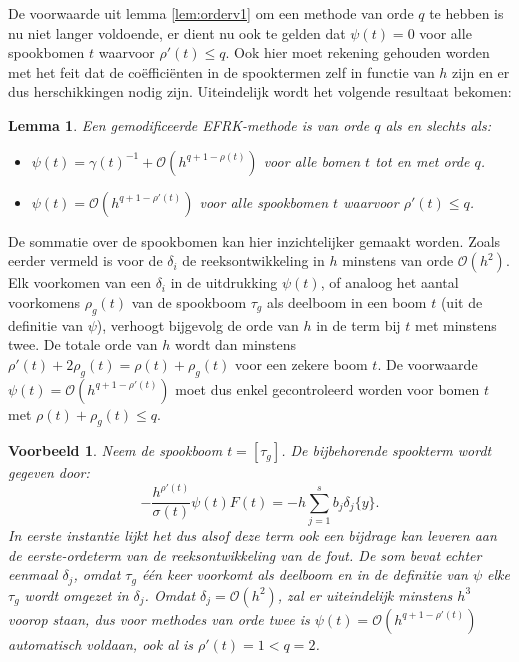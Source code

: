 \documentclass[12pt]{article}
\newtheorem{lem}[defn]{Lemma}
\newtheorem{vbn}[defn]{Voorbeeld}
\begin{document}
De voorwaarde uit lemma \ref{lem:orderv1} om een methode van orde \(q\) te hebben is nu niet langer voldoende, er dient nu ook te gelden dat \(\psi(t)=0\) voor alle spookbomen \(t\) waarvoor \(\rho'(t)\le q\). Ook hier moet rekening gehouden worden met het feit dat de coëfficiënten in de spooktermen zelf in functie van \(h\) zijn en er dus herschikkingen nodig zijn. Uiteindelijk wordt het volgende resultaat bekomen:
\begin{lem} \label{lem:order}
Een gemodificeerde EFRK-methode is van orde \(q\) als en slechts als:
\begin{itemize}
    \item \(\psi(t)=\gamma(t)^{-1}+\mathcal{O}(h^{q+1-\rho(t)})\) voor alle bomen \(t\) tot en met orde \(q\).
    \item \(\psi(t)=\mathcal{O}(h^{q+1-\rho'(t)})\) voor alle spookbomen \(t\) waarvoor \(\rho'(t)\le q\).
\end{itemize}
\end{lem}
De sommatie over de spookbomen kan hier inzichtelijker gemaakt worden. Zoals eerder vermeld is voor de \(\delta_i\) de reeksontwikkeling in \(h\) minstens van orde \(\mathcal{O}(h^2)\). Elk voorkomen van een \(\delta_i\) in de uitdrukking \(\psi(t)\), of analoog het aantal voorkomens \(\rho_g(t)\) van de spookboom \(\tau_g\) als deelboom in een boom \(t\) (uit de definitie van \(\psi\)), verhoogt bijgevolg de orde van \(h\) in de term bij \(t\) met minstens twee. De totale orde van \(h\) wordt dan minstens \(\rho'(t)+2\rho_g(t)=\rho(t)+\rho_g(t)\) voor een zekere boom \(t\). De voorwaarde \(\psi(t)=\mathcal{O}(h^{q+1-\rho'(t)})\) moet dus enkel gecontroleerd worden voor bomen \(t\) met \(\rho(t)+\rho_g(t)\le q\).
\begin{vbn}
    Neem de spookboom \(t=[\tau_g]\). De bijbehorende spookterm wordt gegeven door:
    \[-\frac{h^{\rho'(t)}}{\sigma(t)}\psi(t)F(t)=-h\sum_{j=1}^sb_j\delta_j\{y\}.\]
    In eerste instantie lijkt het dus alsof deze term ook een bijdrage kan leveren aan de eerste-ordeterm van de reeksontwikkeling van de fout. De som bevat echter eenmaal \(\delta_j\), omdat \(\tau_g\) één keer voorkomt als deelboom en in de definitie van \(\psi\) elke \(\tau_g\) wordt omgezet in \(\delta_j\). Omdat \(\delta_j=\mathcal{O}(h^2)\), zal er uiteindelijk minstens \(h^3\) voorop staan, dus voor methodes van orde twee is \(\psi(t)=\mathcal{O}(h^{q+1-\rho'(t)})\) automatisch voldaan, ook al is \(\rho'(t)=1<q=2\).
\end{vbn}
\end{document}

